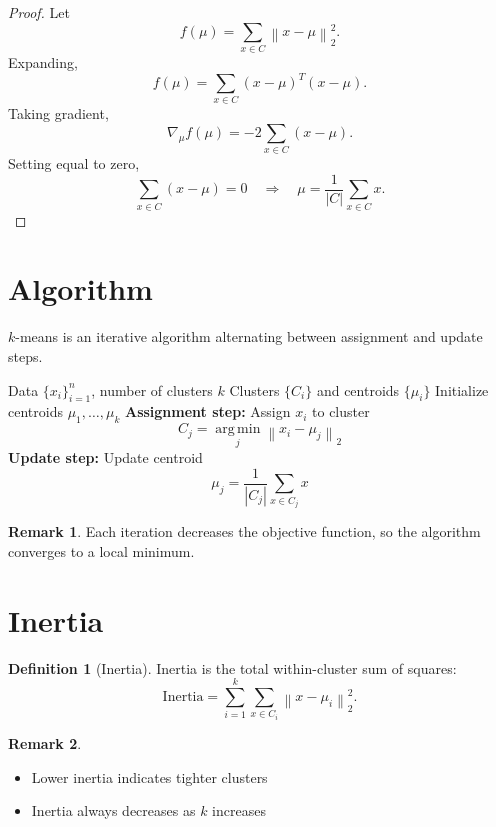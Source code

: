 \documentclass[12pt,oneside]{book}
\numberwithin{equation}{section}
\theoremstyle{definition}
\newtheorem{definition}{Definition}[section]
\newtheorem{remark}{Remark}[section]
\theoremstyle{plain}
\theoremstyle{remark}
\newcommand{\argmin}{\operatorname*{arg\,min}}
\newcommand{\norm}[1]{\left\lVert #1 \right\rVert}
\newcommand{\grad}{\nabla}
\begin{document}
\begin{proof}
Let
\[
f(\mu)
=
\sum_{x \in C} \norm{x-\mu}_2^2.
\]
Expanding,
\[
f(\mu)
=
\sum_{x \in C} (x-\mu)^T(x-\mu).
\]
Taking gradient,
\[
\grad_\mu f(\mu)
=
-2\sum_{x \in C} (x-\mu).
\]
Setting equal to zero,
\[
\sum_{x \in C} (x-\mu)=0
\quad \Rightarrow \quad
\mu=\frac{1}{|C|}\sum_{x \in C} x.
\]
\end{proof}

\section{Algorithm}

$k$-means is an iterative algorithm alternating between assignment and update steps.

\begin{algorithm}[H]
\caption{$k$-Means Clustering}
\begin{algorithmic}[1]
\Require Data $\{x_i\}_{i=1}^n$, number of clusters $k$
\Ensure Clusters $\{C_i\}$ and centroids $\{\mu_i\}$
\State Initialize centroids $\mu_1,\dots,\mu_k$
\Repeat
    \State \textbf{Assignment step:}
        \State Assign $x_i$ to cluster
        \[
        C_j = \argmin_{j} \norm{x_i-\mu_j}_2
        \]
    \EndFor
    \State \textbf{Update step:}
        \State Update centroid
        \[
        \mu_j = \frac{1}{|C_j|}\sum_{x \in C_j} x
        \]
    \EndFor
{}
\end{algorithmic}
\end{algorithm}

\begin{remark}
Each iteration decreases the objective function, so the algorithm converges to a local minimum.
\end{remark}

\section{Inertia}

\begin{definition}[Inertia]
Inertia is the total within-cluster sum of squares:
\[
\text{Inertia}
=
\sum_{i=1}^k
\sum_{x \in C_i}
\norm{x-\mu_i}_2^2.
\]
\end{definition}

\begin{remark}
\begin{itemize}
    \item Lower inertia indicates tighter clusters
    \item Inertia always decreases as $k$ increases
\end{itemize}
\end{remark}
\end{document}

